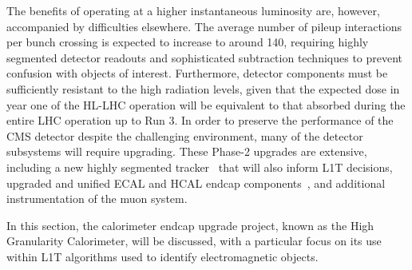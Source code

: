 The benefits of operating at a higher instantaneous luminosity are, however, accompanied by difficulties elsewhere. The average number of pileup interactions per bunch crossing is expected to increase to around 140, requiring highly segmented detector readouts and sophisticated subtraction techniques to prevent confusion with objects of interest. Furthermore, detector components must be sufficiently resistant to the high radiation levels, given that the expected dose in year one of the HL-LHC operation will be equivalent to that absorbed during the entire LHC operation up to Run 3. In order to preserve the performance of the CMS detector despite the challenging environment, many of the detector subsystems will require upgrading. These Phase-2 upgrades are extensive, including a new highly segmented tracker~\cite{CMS_phase2_tracker_upgrade} that will also inform L1T decisions, upgraded and unified ECAL and HCAL endcap components~\cite{CMS_phase2_HGCAL}, and additional instrumentation of the muon system. 

In this section, the calorimeter endcap upgrade project, known as the High Granularity Calorimeter, will be discussed, with a particular focus on its use within L1T algorithms used to identify electromagnetic objects.

